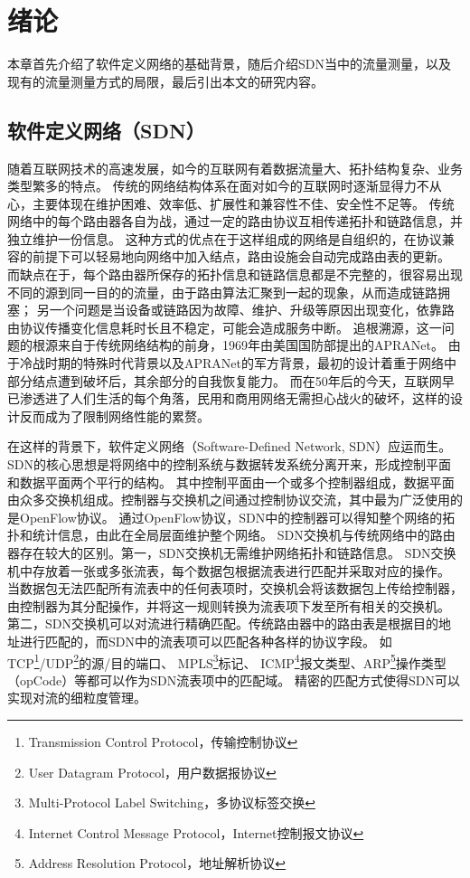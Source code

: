 \chapter{绪论}
本章首先介绍了软件定义网络的基础背景，随后介绍SDN当中的流量测量，以及现有的流量测量方式的局限，最后引出本文的研究内容。
\section{软件定义网络（SDN）}
随着互联网技术的高速发展，如今的互联网有着数据流量大、拓扑结构复杂、业务类型繁多的特点。
传统的网络结构体系在面对如今的互联网时逐渐显得力不从心，主要体现在维护困难、效率低、扩展性和兼容性不佳、安全性不足等。
传统网络中的每个路由器各自为战，通过一定的路由协议互相传递拓扑和链路信息，并独立维护一份信息。
这种方式的优点在于这样组成的网络是自组织的，在协议兼容的前提下可以轻易地向网络中加入结点，路由设施会自动完成路由表的更新。
而缺点在于，每个路由器所保存的拓扑信息和链路信息都是不完整的，很容易出现不同的源到同一目的的流量，由于路由算法汇聚到一起的现象，从而造成链路拥塞\cite{vissicchio2015central}；
另一个问题是当设备或链路因为故障、维护、升级等原因出现变化，依靠路由协议传播变化信息耗时长且不稳定，可能会造成服务中断\cite{xu2018achieving}。
追根溯源，这一问题的根源来自于传统网络结构的前身，1969年由美国国防部提出的APRANet。
由于冷战时期的特殊时代背景以及APRANet的军方背景，最初的设计着重于网络中部分结点遭到破坏后，其余部分的自我恢复能力。
而在50年后的今天，互联网早已渗透进了人们生活的每个角落，民用和商用网络无需担心战火的破坏，这样的设计反而成为了限制网络性能的累赘。

在这样的背景下，软件定义网络（Software-Defined Network, SDN）\cite{mckeown2008openflow}应运而生。
SDN的核心思想是将网络中的控制系统与数据转发系统分离开来，形成控制平面和数据平面两个平行的结构。
其中控制平面由一个或多个控制器组成，数据平面由众多交换机组成。控制器与交换机之间通过控制协议交流，其中最为广泛使用的是OpenFlow协议。
通过OpenFlow协议，SDN中的控制器可以得知整个网络的拓扑和统计信息，由此在全局层面维护整个网络。
SDN交换机与传统网络中的路由器存在较大的区别。第一，SDN交换机无需维护网络拓扑和链路信息。
SDN交换机中存放着一张或多张流表，每个数据包根据流表进行匹配并采取对应的操作。
当数据包无法匹配所有流表中的任何表项时，交换机会将该数据包上传给控制器，由控制器为其分配操作，并将这一规则转换为流表项下发至所有相关的交换机。
第二，SDN交换机可以对流进行精确匹配。传统路由器中的路由表是根据目的地址进行匹配的，而SDN中的流表项可以匹配各种各样的协议字段。
如TCP\footnote{Transmission Control Protocol，传输控制协议}/UDP\footnote{User Datagram Protocol，用户数据报协议}的源/目的端口、
MPLS\footnote{Multi-Protocol Label Switching，多协议标签交换}标记\cite{davie2000mpls}、
ICMP\footnote{Internet Control Message Protocol，Internet控制报文协议}报文类型、ARP\footnote{Address Resolution Protocol，地址解析协议}操作类型（opCode）等都可以作为SDN流表项中的匹配域。
精密的匹配方式使得SDN可以实现对流的细粒度管理\cite{xu2017joint}。

